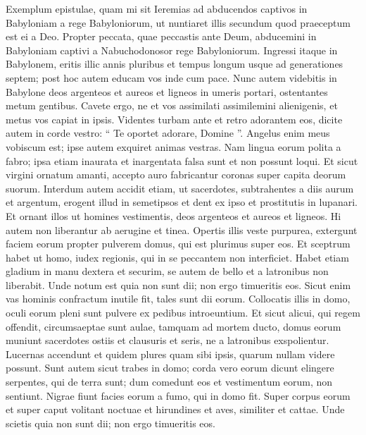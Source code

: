 \begin{biblechapter}
\begin{biblechapter}
\begin{biblechapter}
\begin{biblechapter}
\begin{biblechapter}
\begin{biblechapter}
 Exemplum epistulae, quam mi sit Ieremias ad abducendos captivos in Babyloniam a rege Babyloniorum, ut nuntiaret illis secundum quod praeceptum est ei a Deo.
 \verse Propter peccata, quae peccastis ante Deum, abducemini in Babyloniam captivi a Nabuchodonosor rege Babyloniorum. 
\verse Ingressi itaque in Babylonem, eritis illic annis pluribus et tempus longum usque ad generationes septem; post hoc autem educam vos inde cum pace. 
\verse Nunc autem videbitis in Babylone deos argenteos et aureos et ligneos in umeris portari, ostentantes metum gentibus. 
 \verse Cavete ergo, ne et vos assimilati assimilemini alienigenis, et metus vos capiat in ipsis. 
\verse Videntes turbam ante et retro adorantem eos, dicite autem in corde vestro: “ Te oportet adorare, Domine ”. 
\verse Angelus enim meus vobiscum est; ipse autem exquiret animas vestras. 
\verse Nam lingua eorum polita a fabro; ipsa etiam inaurata et inargentata falsa sunt et non possunt loqui. 
 \verse Et sicut virgini ornatum amanti, accepto auro fabricantur 
\verse coronas super capita deorum suorum. Interdum autem accidit etiam, ut sacerdotes, subtrahentes a diis aurum et argentum, erogent illud in semetipsos 
\verse et dent ex ipso et prostitutis in lupanari. Et ornant illos ut homines vestimentis, deos argenteos et aureos et ligneos. 
\verse Hi autem non liberantur ab aerugine et tinea. 
 \verse Opertis illis veste purpurea, extergunt faciem eorum propter pulverem domus, qui est plurimus super eos. 
\verse Et sceptrum habet ut homo, iudex regionis, qui in se peccantem non interficiet. 
\verse Habet etiam gladium in manu dextera et securim, se autem de bello et a latronibus non liberabit. Unde notum est quia non sunt dii; 
\verse non ergo timueritis eos.
 Sicut enim vas hominis confractum inutile fit, tales sunt dii eorum. 
\verse Collocatis illis in domo, oculi eorum pleni sunt pulvere ex pedibus introeuntium. 
\verse Et sicut alicui, qui regem offendit, circumsaeptae sunt aulae, tamquam ad mortem ducto, domus eorum muniunt sacerdotes ostiis et clausuris et seris, ne a latronibus exspolientur. 
\verse Lucernas accendunt et quidem plures quam sibi ipsis, quarum nullam videre possunt. 
\verse Sunt autem sicut trabes in domo; corda vero eorum dicunt elingere serpentes, qui de terra sunt; dum comedunt eos et vestimentum eorum, non sentiunt. 
\verse Nigrae fiunt facies eorum a fumo, qui in domo fit. 
\verse Super corpus eorum et super caput volitant noctuae et hirundines et aves, similiter et cattae. 
\verse Unde scietis quia non sunt dii; non ergo timueritis eos.

\end{biblechapter}
\end{biblechapter}
\end{biblechapter}
\end{biblechapter}
\end{biblechapter}
\end{biblechapter}
